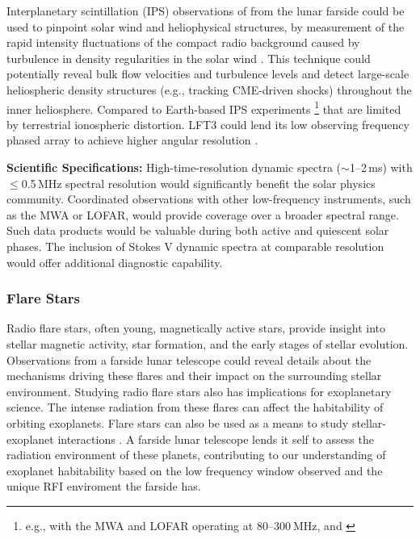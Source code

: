
Interplanetary scintillation (IPS) observations of from the lunar farside could be used to pinpoint solar wind and heliophysical structures, by measurement of the rapid intensity fluctuations of the compact radio background caused by turbulence in density regularities in the solar wind \citep{fallows_application_2023}. This technique could potentially reveal bulk flow velocities and turbulence levels and detect large-scale heliospheric density structures (e.g., tracking CME-driven shocks) throughout the inner heliosphere. Compared to Earth-based IPS experiments \footnote{e.g., with the MWA and LOFAR operating at $80$–$300~\text{MHz}$, \cite{fallows_separating_2016} and \cite{kaplan_murchison_2015}} that are limited by terrestrial ionospheric distortion. LFT3 could lend its low observing frequency phased array to achieve higher angular resolution \citep{DEX}. 


\textbf{Scientific Specifications:} High-time-resolution dynamic spectra ($\sim$1--2\,ms) with $\leq$0.5\,MHz spectral resolution would significantly benefit the solar physics community. Coordinated observations with other low-frequency instruments, such as the MWA or LOFAR, would provide coverage over a broader spectral range. Such data products would be valuable during both active and quiescent solar phases. The inclusion of Stokes V dynamic spectra at comparable resolution would offer additional diagnostic capability.


\subsubsection{Flare Stars}

Radio flare stars, often young, magnetically active stars, provide insight into stellar magnetic activity, star formation, and the early stages of stellar evolution. Observations from a farside lunar telescope could reveal details about the mechanisms driving these flares and their impact on the surrounding stellar environment. Studying radio flare stars also has implications for exoplanetary science. The intense radiation from these flares can affect the habitability of orbiting exoplanets. Flare stars can also be used as a means to study stellar-exoplanet interactions \citep{joe_nature_review}. A farside lunar telescope lends it self to assess the radiation environment of these planets, contributing to our understanding of exoplanet habitability based on the low frequency window observed and the unique RFI enviroment the farside has.

